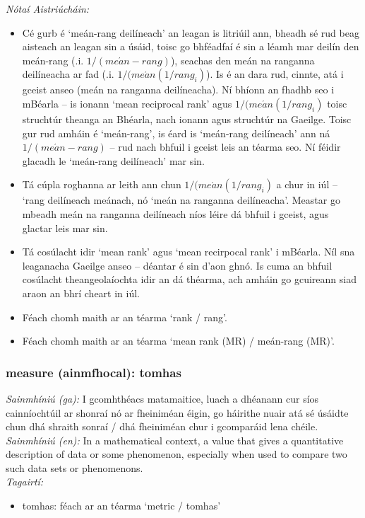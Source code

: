  \noindent \textit{Nótaí Aistriúcháin:}
\begin{itemize}
	\item Cé gurb é `meán-rang deilíneach' an leagan is litriúil ann, bheadh sé rud beag aisteach an leagan sin a úsáid, toisc go bhféadfaí é sin a léamh mar deilín den meán-rang (.i. $1 / (me\acute{a}n-rang)$), seachas den meán na ranganna deilíneacha ar fad (.i. $1 / (me\acute{a}n(1 / rang_i)$). Is é an dara rud, cinnte, atá i gceist anseo (meán na ranganna deilíneacha). Ní bhíonn an fhadhb seo i mBéarla -- is ionann `mean reciprocal rank' agus $1 / (me\acute{a}n(1 / rang_i)$ toisc struchtúr theanga an Bhéarla, nach ionann agus struchtúr na Gaeilge. Toisc gur rud amháin é `meán-rang', is éard is `meán-rang deilíneach' ann ná $1 / (me\acute{a}n-rang)$ -- rud nach bhfuil i gceist leis an téarma seo. Ní féidir glacadh le `meán-rang deilíneach' mar sin.
	\item Tá cúpla roghanna ar leith ann chun $1 / (me\acute{a}n(1 / rang_i)$ a chur in iúl -- `rang deilíneach meánach, nó `meán na ranganna deilíneacha'. Meastar go mbeadh meán na ranganna deilíneach níos léire dá bhfuil i gceist, agus glactar leis mar sin.
	\item Tá cosúlacht idir `mean rank' agus `mean recirpocal rank' i mBéarla. Níl sna leaganacha Gaeilge anseo -- déantar é sin d'aon ghnó. Is cuma an bhfuil cosúlacht theangeolaíochta idir an dá théarma, ach amháin go gcuireann siad araon an bhrí cheart in iúl.
	\item Féach chomh maith ar an téarma `rank / rang'.
	\item Féach chomh maith ar an téarma `mean rank (MR) / meán-rang (MR)'.
\end{itemize}


\subsubsection*{measure (ainmfhocal): tomhas}
 \noindent \textit{Sainmhíniú (ga):} I gcomhthéacs matamaitice, luach a dhéanann cur síos cainníochtúil ar shonraí nó ar fheiniméan éigin, go háirithe nuair atá sé úsáidte chun dhá shraith sonraí / dhá fheiniméan chur i gcomparáid lena chéile.
\\
 \noindent \textit{Sainmhíniú (en):} In a mathematical context, a value that gives a quantitative description of data or some phenomenon, especially when used to compare two such data sets or phenomenons.
\\
 \noindent \textit{Tagairtí:}
\begin{itemize}
	\item tomhas: féach ar an téarma `metric / tomhas'
\end{itemize}

